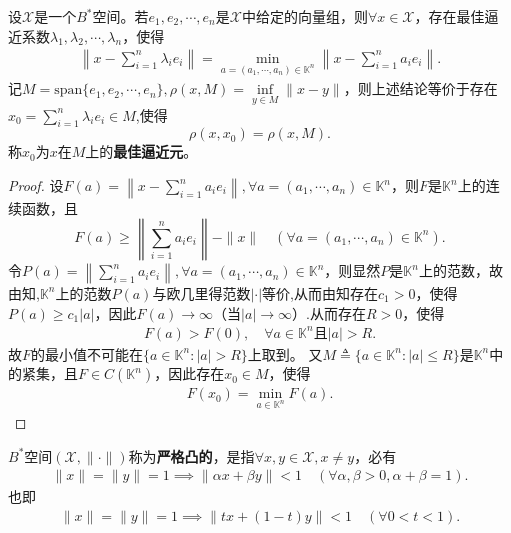 \documentclass[../../main.tex]{subfiles}%
\begin{document}
\begin{theorem}\label{theorem:最佳逼近元的存在性}
设$\mathscr{X}$是一个$B^*$空间。若$e_1,e_2,\cdots,e_n$是$\mathscr{X}$中给定的向量组，则$\forall x \in \mathscr{X}$，存在最佳逼近系数$\lambda_1,\lambda_2,\cdots,\lambda_n$，使得
\begin{align*}
\left\| x-\sum_{i=1}^n{\lambda _ie_i} \right\| =\min_{a=\left( a_1,\cdots ,a_n \right) \in \mathbb{K} ^n} \left\| x-\sum_{i=1}^n{a_ie_i} \right\| .
\end{align*}
记$M = \text{span}\{e_1,e_2,\cdots,e_n\}, \rho(x,M) = \inf\limits_{y \in M} \|x-y\|$，则上述结论等价于存在$x_0 = \sum\limits_{i=1}^n \lambda_i e_i\in M$,使得
$$\rho(x,x_0) = \rho(x,M).$$
称$x_0$为$x$在$M$上的\textbf{最佳逼近元}。
\end{theorem}
\begin{proof}
设$F(a) = \left\| x - \sum\limits_{i=1}^n a_i e_i \right\| ,\forall a =(a_1,\cdots,a_n)\in \mathbb{K}^n$，则$F$是$\mathbb{K}^n$上的连续函数，且
$$F(a) \geqslant \left\| \sum\limits_{i=1}^n a_i e_i \right\| - \|x\| \quad (\forall a=(a_1,\cdots,a_n) \in \mathbb{K}^n).$$
令$P(a) = \left\| \sum\limits_{i=1}^n a_i e_i \right\|,\forall a =(a_1,\cdots,a_n)\in \mathbb{K}^n$，则显然$P$是$\mathbb{K}^n$上的范数，故由知,$\mathbb{K}^n$上的范数$P(a)$与欧几里得范数$|\cdot|$等价,从而由知存在$c_1>0$，使得$P(a) \geqslant c_1 |a|$，因此$F(a) \to \infty$（当$|a| \to \infty$）.从而存在$R>0$，使得
\begin{align*}
F(a) > F(0), \quad \forall a\in \mathbb{K}^n \text{且} |a|>R.
\end{align*}
故$F$的最小值不可能在$\{ a\in \mathbb{K}^n:|a|>R \}$上取到。
又$M\triangleq \{ a\in \mathbb{K}^n:|a|\leqslant R \}$是$\mathbb{K}^n$中的紧集，且$F\in C(\mathbb{K}^n)$，因此存在$x_0\in M$，使得
\begin{align*}
F(x_0) = \min\limits_{a\in \mathbb{K}^n} F(a).
\end{align*}
\end{proof}

\begin{definition}[严格凸的]
$B^*$空间$(\mathscr{X},\|\cdot\|)$称为\textbf{严格凸的}，是指$\forall x,y \in \mathscr{X}, x \neq y$，必有
\begin{align*}
\|x\| = \|y\| = 1 \implies \|\alpha x + \beta y\| < 1 \quad (\forall \alpha,\beta>0, \alpha+\beta=1).
\end{align*}
也即
\begin{align*}
\|x\| = \|y\| = 1 \implies \|t x + (1-t) y\| < 1 \quad (\forall 0<t<1).
\end{align*}
\end{definition}
\end{document}
